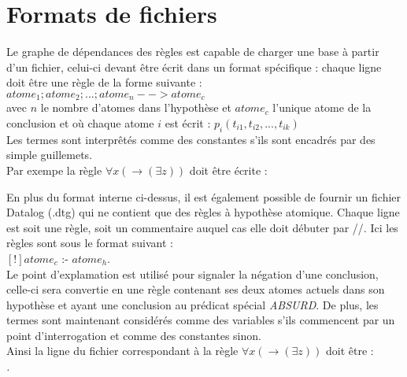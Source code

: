 \section{Formats de fichiers}\label{formats_fichiers}
Le graphe de dépendances des règles est capable de charger une base à partir d'un
fichier, celui-ci devant être écrit dans un format spécifique : chaque ligne doit être
une règle de la forme suivante :\\
$atome_1;atome_2;...;atome_n-->atome_c$\\
avec $n$ le nombre d'atomes dans l'hypothèse et $atome_c$ l'unique atome de la conclusion et
où chaque atome $i$ est écrit :
$p_i(t_{i1},t_{i2},...,t_{ik})$\\
Les termes sont interprêtés comme des constantes s'ils sont encadrés par des simple
guillemets.\\%
Par exempe la règle $\forall x ( \rightarrow (\exists z ) )$ doit être écrite : \\
{\em }

En plus du format interne ci-dessus, il est également possible de fournir un fichier
Datalog (.dtg) qui ne contient que des règles à hypothèse atomique. Chaque ligne est soit
une règle, soit un commentaire auquel cas elle doit débuter par //.
Ici les règles sont sous le format suivant :\\
$[!]atome_c$ :- $atome_h$.\\
Le point d'explamation est utilisé pour signaler la négation d'une conclusion, celle-ci
sera convertie en une règle contenant ses deux atomes actuels dans son hypothèse et ayant
une conclusion au prédicat spécial {\em ABSURD}.
De plus, les termes sont maintenant considérés comme des variables s'ils commencent par
un point d'interrogation et comme des constantes sinon.\\%
Ainsi la ligne du fichier correspondant à la règle $\forall x ( \rightarrow (\exists z ) )$ 
doit être :\\
{\em .}

